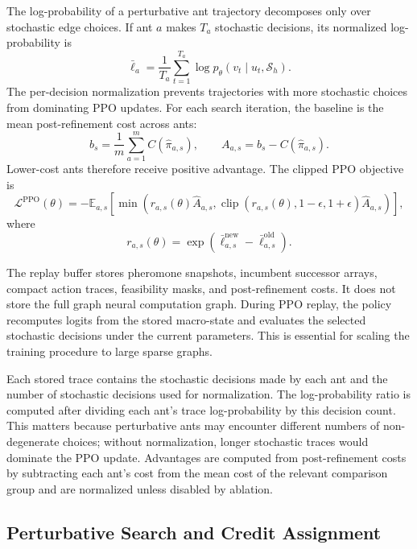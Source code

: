 \documentclass[11pt]{article}
\begin{document}
The log-probability of a perturbative ant trajectory decomposes only over stochastic edge choices.
If ant $a$ makes $T_a$ stochastic decisions, its normalized log-probability is
\begin{equation}
\bar{\ell}_a
= \frac{1}{T_a}
\sum_{t=1}^{T_a}
\log p_\theta(v_t \mid u_t,\mathcal{S}_h).
\end{equation}
The per-decision normalization prevents trajectories with more stochastic choices from dominating PPO updates.
For each search iteration, the baseline is the mean post-refinement cost across ants:
\begin{equation}
b_s = \frac{1}{m}\sum_{a=1}^{m} C(\hat{\pi}_{a,s}),
\qquad
A_{a,s}=b_s-C(\hat{\pi}_{a,s}).
\end{equation}
Lower-cost ants therefore receive positive advantage.
The clipped PPO objective is
\begin{equation}
\mathcal{L}^{\mathrm{PPO}}(\theta)
=
-\mathbb{E}_{a,s}
\left[
\min
\left(
r_{a,s}(\theta)\hat{A}_{a,s},
\operatorname{clip}(r_{a,s}(\theta),1-\epsilon,1+\epsilon)\hat{A}_{a,s}
\right)
\right],
\end{equation}
where
\begin{equation}
r_{a,s}(\theta)
=
\exp\left(
\bar{\ell}_{a,s}^{\mathrm{new}}
-
\bar{\ell}_{a,s}^{\mathrm{old}}
\right).
\end{equation}

The replay buffer stores pheromone snapshots, incumbent successor arrays, compact action traces, feasibility masks, and post-refinement costs.
It does not store the full graph neural computation graph.
During PPO replay, the policy recomputes logits from the stored macro-state and evaluates the selected stochastic decisions under the current parameters.
This is essential for scaling the training procedure to large sparse graphs.

Each stored trace contains the stochastic decisions made by each ant and the number of stochastic decisions used for normalization.
The log-probability ratio is computed after dividing each ant's trace log-probability by this decision count.
This matters because perturbative ants may encounter different numbers of non-degenerate choices; without normalization, longer stochastic traces would dominate the PPO update.
Advantages are computed from post-refinement costs by subtracting each ant's cost from the mean cost of the relevant comparison group and are normalized unless disabled by ablation.

\subsection{Perturbative Search and Credit Assignment}
\label{sec:search-detail}
\end{document}
